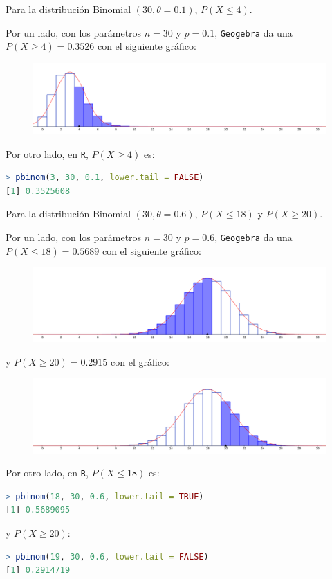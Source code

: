 \begin{ejer}[0,5]
	Para la distribución Binomial $(30, \theta = 0.1)$, $P(X \leq 4)$.	
\end{ejer}
\begin{sol}
	Por un lado, con los parámetros $n=30$ y $p=0.1$, \texttt{Geogebra} da una $P(X\geq 4) = 0.3526$ con el siguiente gráfico:
	\begin{figure}[H]
	\includegraphics[width=0.5\linewidth]{pics/g4}
	\centering
	\end{figure}\noindent
	Por otro lado, en \texttt{R}, $P(X\geq 4)$ es:
	\begin{lstlisting}[language=R]
> pbinom(3, 30, 0.1, lower.tail = FALSE)
[1] 0.3525608
	\end{lstlisting}
\end{sol}
\begin{ejer}[1]
	 Para la distribución Binomial $(30, \theta = 0.6)$, $P(X \leq 18)$ y $P(X \geq 20)$.
\end{ejer}
\begin{sol}
	Por un lado, con los parámetros $n=30$ y $p=0.6$, \texttt{Geogebra} da una $P(X\leq 18) = 0.5689$ con el siguiente gráfico:
	\begin{figure}[H]
	\includegraphics[width=0.5\linewidth]{pics/g5-1}
	\centering
	\end{figure}\noindent
	y $P(X \geq 20) = 0.2915$ con el gráfico:
	\begin{figure}[H]
	\includegraphics[width=0.5\linewidth]{pics/g5-2}
	\centering
	\end{figure}\noindent
	Por otro lado, en \texttt{R}, $P(X\leq 18)$ es:
	\begin{lstlisting}[language=R]
> pbinom(18, 30, 0.6, lower.tail = TRUE)
[1] 0.5689095
	\end{lstlisting}
	y $P(X \geq 20)$:
	\begin{lstlisting}[language=R]
> pbinom(19, 30, 0.6, lower.tail = FALSE)
[1] 0.2914719
	\end{lstlisting}
\end{sol}

